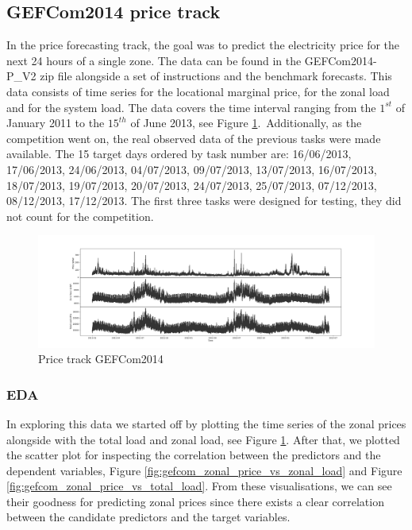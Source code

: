\subsection{GEFCom2014 price track}
In the price forecasting track, the goal was to predict the electricity price for the next 24 hours of a single zone. 
The data can be found in the GEFCom2014-P\_V2 zip file alongside a set of instructions and the benchmark forecasts.
This data consists of time series for the locational marginal price, for the zonal load and for the system load. The data covers the time interval ranging from the $1^{st}$ of January 2011 to the $15^{th}$ of June 2013, see Figure \ref{fig:price_track_fig1}.\ 
Additionally, as the competition went on, the real observed data of the previous tasks were made available.
The 15 target days ordered by task number are: 16/06/2013, 17/06/2013, 24/06/2013, 04/07/2013, 09/07/2013, 13/07/2013, 16/07/2013, 18/07/2013, 19/07/2013, 20/07/2013, 24/07/2013, 25/07/2013, 07/12/2013, 08/12/2013, 17/12/2013. 
The first three tasks were designed for testing, they did not count for the competition.
\begin{figure}[!h]
    \includegraphics[width=\textwidth]{images/price_track_fig1.png}
    \caption{Price track GEFCom2014}
    \label{fig:price_track_fig1}
\end{figure}
\subsubsection{EDA}
In exploring this data we started off by plotting the time series of the zonal prices alongside with the total load and zonal load, see Figure \ref{fig:price_track_fig1}.
After that, we plotted the scatter plot for inspecting the correlation between the predictors and the dependent variables, Figure \ref{fig:gefcom_zonal_price_vs_zonal_load} and Figure \ref{fig:gefcom_zonal_price_vs_total_load}. From these visualisations, we can see their goodness for predicting zonal prices since there exists a clear correlation between the candidate predictors and the target variables.

